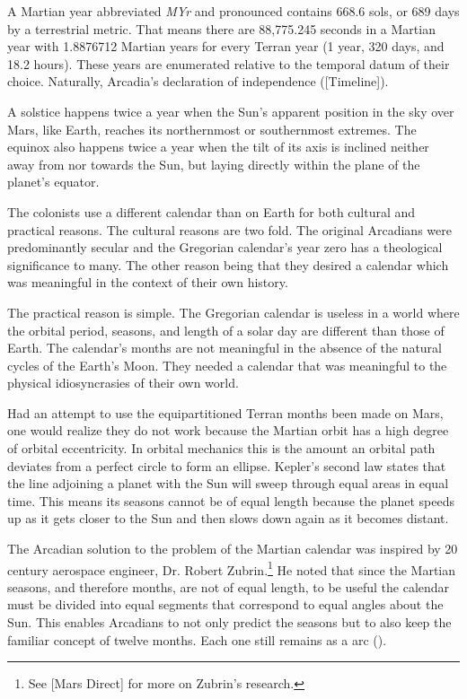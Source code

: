 A Martian year abbreviated {\it MYr} and pronounced  contains 668.6 sols, or 689 days by a terrestrial metric. That means there are 88,775.245 seconds in a Martian year with 1.8876712 Martian years for every Terran year (1 year, 320 days, and 18.2 hours). These years are enumerated relative to the temporal datum of their choice. Naturally, Arcadia's declaration of independence ([Timeline]).


A solstice happens twice a year when the Sun's apparent position in the sky over Mars, like Earth, reaches its northernmost or southernmost extremes. The equinox also happens twice a year when the tilt of its axis is inclined neither away from nor towards the Sun, but laying directly within the plane of the planet's equator.


The colonists use a different calendar than on Earth for both cultural and practical reasons. The cultural reasons are two fold. The original Arcadians were predominantly secular and the Gregorian calendar's year zero has a theological significance to many. The other reason being that they desired a calendar which was meaningful in the context of their own history.

The practical reason is simple. The Gregorian calendar is useless in a world where the orbital period, seasons, and length of a solar day are different than those of Earth. The calendar's months are not meaningful in the absence of the natural cycles of the Earth's Moon. They needed a calendar that was meaningful to the physical idiosyncrasies of their own world.

Had an attempt to use the equipartitioned Terran months been made on Mars, one would realize they do not work because the Martian orbit has a high degree of orbital eccentricity. In orbital mechanics this is the amount an orbital path deviates from a perfect circle to form an ellipse. Kepler's second law states that the line adjoining a planet with the Sun will sweep through equal areas in equal time. This means its seasons cannot be of equal length because the planet speeds up as it gets closer to the Sun and then slows down again as it becomes distant.

The Arcadian solution to the problem of the Martian calendar was inspired by 20 century aerospace engineer, Dr. Robert Zubrin.\footnote{See [Mars Direct] for more on Zubrin's research.} He noted that since the Martian seasons, and therefore months, are not of equal length, to be useful the calendar must be divided into equal segments that correspond to equal angles about the Sun. This enables Arcadians to not only predict the seasons but to also keep the familiar concept of twelve months. Each one still remains as a  arc (). 

